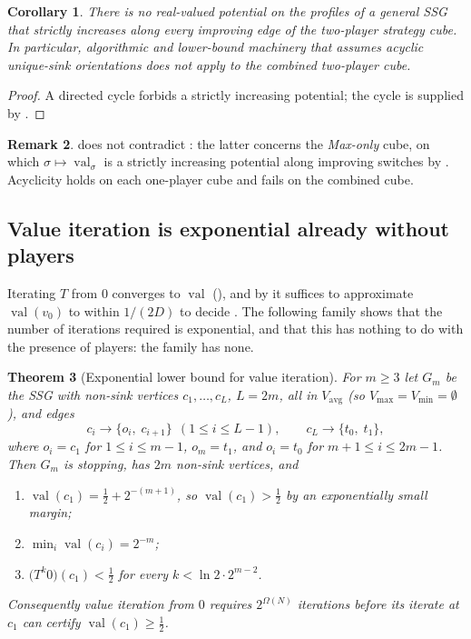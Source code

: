\documentclass[11pt]{article}
\theoremstyle{plain}
\newtheorem{theorem}{Theorem}[section]
\newtheorem{corollary}[theorem]{Corollary}
\theoremstyle{definition}
\newtheorem{remark}[theorem]{Remark}
\DeclareMathOperator{\val}{val}
\newcommand{\Vmax}{V_{\max}}
\newcommand{\Vmin}{V_{\min}}
\newcommand{\Vavg}{V_{\mathrm{avg}}}
\begin{document}
\begin{corollary}\label{cor:no-potential}
There is no real-valued potential on the profiles of a general SSG that
strictly increases along every improving edge of the two-player strategy
cube. In particular, algorithmic and lower-bound machinery that assumes
acyclic unique-sink orientations does not apply to the combined
two-player cube.
\end{corollary}

\begin{proof}
A directed cycle forbids a strictly increasing potential; the cycle is
supplied by .
\end{proof}

\begin{remark}
 does not contradict : the
latter concerns the \emph{Max-only} cube, on which $\sigma\mapsto\val_\sigma$
is a strictly increasing potential along improving switches by
. Acyclicity holds on each one-player cube and fails
on the combined cube.
\end{remark}

\subsection{Value iteration is exponential already without players}

Iterating $T$ from $0$ converges to $\val$ (), and
by  it suffices to approximate $\val(v_0)$ to
within $1/(2D)$ to decide . The following family shows
that the number of iterations required is exponential, and that this has
nothing to do with the presence of players: the family has none.

\begin{theorem}[Exponential lower bound for value iteration]\label{thm:vi-lower}
For $m\ge3$ let $G_m$ be the SSG with non-sink vertices
$c_1,\dots,c_L$, $L=2m$, \emph{all} in $\Vavg$ (so
$\Vmax=\Vmin=\emptyset$), and edges
\[
  c_i\to\{o_i,\;c_{i+1}\}\ \ (1\le i\le L-1),\qquad c_L\to\{t_0,\;t_1\},
\]
where $o_i=c_1$ for $1\le i\le m-1$, $o_m=t_1$, and $o_i=t_0$ for
$m+1\le i\le 2m-1$. Then $G_m$ is stopping, has $2m$ non-sink vertices,
and
\begin{enumerate}[label=(\roman*),leftmargin=2.2em]
\item $\val(c_1)=\tfrac12+2^{-(m+1)}$, so $\val(c_1)>\tfrac12$ by an
  exponentially small margin;
\item $\min_i\val(c_i)=2^{-m}$;
\item $\bigl(T^{k}0\bigr)(c_1)<\tfrac12$ for every
  $k<\ln 2\cdot 2^{m-2}$.
\end{enumerate}
Consequently value iteration from $0$ requires $2^{\Omega(N)}$ iterations
before its iterate at $c_1$ can certify $\val(c_1)\ge\tfrac12$.
\end{theorem}
\end{document}
